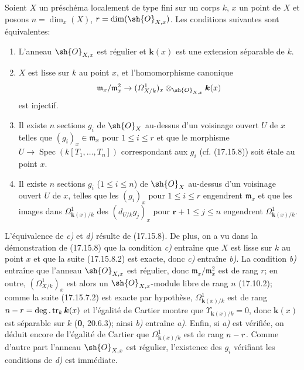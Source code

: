 \begin{corollary}[17.15.9]
\label{IV.17.15.9}
Soient $X$ un préschéma localement de type fini sur un corps $k$, $x$ un point de $X$ et posons $n=\dim_x(X)$, $r=\dim(\sh{O}_{X,x})$. Les conditions suivantes sont équivalentes:
\begin{enumerate}
  \item[\textup{a)}] L'anneau $\sh{O}_{X,x}$ est régulier et $\boldsymbol{k}(x)$ est une extension séparable de $k$.
  \item[\textup{b)}] $X$ est lisse sur $k$ au point $x$, et l'homomorphisme canonique
  \[
  \mathfrak m_x/\mathfrak m_x^2\to(\varOmega^1_{X/k})_x\otimes_{\sh{O}_{X,x}}\boldsymbol{k}(x)
  \]
  est injectif.
  \item[\textup{c)}] Il existe $n$ sections $g_i$ de $\sh{O}_X$ au-dessus d'un voisinage ouvert $U$ de $x$ telles que $(g_i)_x\in\mathfrak m_x$ pour $1\leq i\leq r$ et que le morphisme $U\to\operatorname{Spec}(k[T_1,\ldots,T_n])$ correspondant aux $g_i$ \textup{(cf. (17.15.8))} soit étale au point $x$.
  \item[\textup{d)}] Il existe $n$ sections $g_i$ \textup{(}$1\leq i\leq n$\textup{)} de $\sh{O}_X$ au-dessus d'un voisinage ouvert $U$ de $x$, telles que les $(g_i)_x$ pour $1\leq i\leq r$ engendrent $\mathfrak m_x$ et que les images dans $\Omega^1_{\mathbf{k}(x)/k}$ des $(d_{U/k}g_j)_x$ pour $\boldsymbol{r}+1\leq j\leq n$ engendrent $\Omega^1_{\mathbf{k}(x)/k}$.
\end{enumerate}
\end{corollary}

L'équivalence de \emph{c)} et \emph{d)} résulte de (17.15.8). De plus, on a vu dans la démonstration de (17.15.8) que la condition \emph{c)} entraîne que $X$ est lisse sur $k$ au point $x$ et que la suite (17.15.8.2) est exacte, donc \emph{c)} entraîne \emph{b)}. La condition \emph{b)} entraîne que l'anneau $\sh{O}_{X,x}$ est régulier, donc $\mathfrak m_x/\mathfrak m_x^2$ est de rang $r$; en outre, $(\varOmega^1_{X/k})_x$ est alors un $\sh{O}_{X,x}$-module libre de rang $n$ (17.10.2); comme la suite (17.15.7.2) est exacte par hypothèse, $\Omega^1_{\mathbf{k}(x)/k}$ est de rang $n- r=\deg.\operatorname{tr}_k \boldsymbol{k}(x)$ et l'égalité de Cartier montre que $\Upsilon_{\mathbf{k}(x)/k}=0$, donc $\boldsymbol{k}(x)$ est séparable sur $k$ (\textbf{0}, 20.6.3); ainsi \emph{b)} entraîne \emph{a)}. Enfin, si \emph{a)}
est vérifiée, on déduit encore de l'égalité de Cartier que $\Omega^1_{\mathbf{k}(x)/k}$ est de rang $n- r$. Comme d'autre part l'anneau $\sh{O}_{X,x}$ est régulier, l'existence des $g_i$ vérifiant les conditions de \emph{d)} est immédiate.

